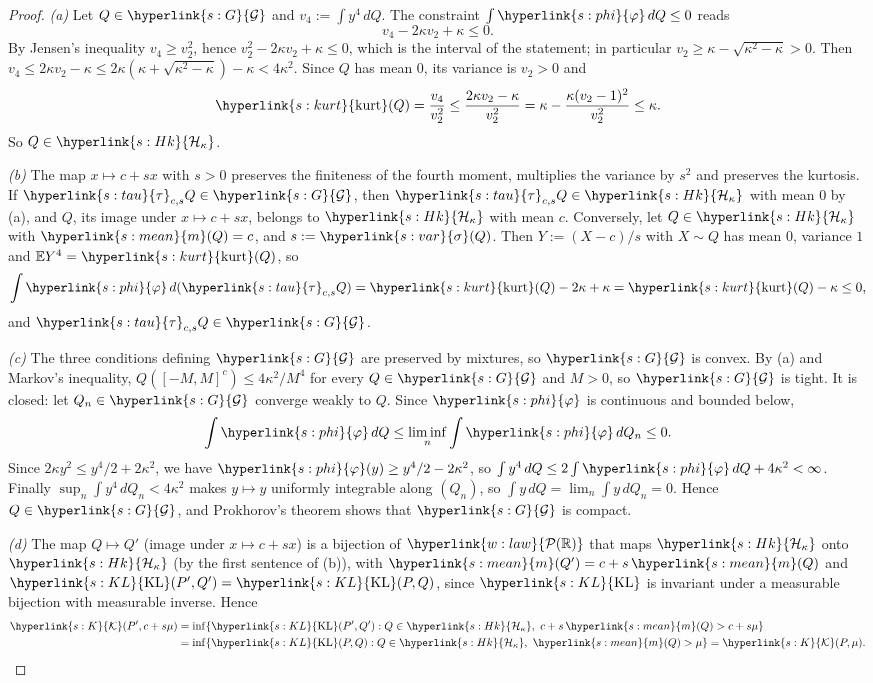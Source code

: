 \documentclass[11pt]{article}
\newcommand{\E}{\mathbb{E}}
\newcommand{\Pspace}{\term{w:law}{\mathcal{P}(\mathbb{R})}}
\newcommand{\sy}[2]{{\hyperlink{#1}{#2}}}
\newcommand{\term}[2]{\hyperlink{#1}{#2}}
\newcommand{\mean}{\sy{s:mean}{m}}
\newcommand{\sd}{\sy{s:var}{\sigma}}
\newcommand{\kurt}{\sy{s:kurt}{\mathrm{kurt}}}
\newcommand{\KL}{\sy{s:KL}{\mathrm{KL}}}
\newcommand{\Hk}{\sy{s:Hk}{\mathcal{H}_{\kappa}}}
\newcommand{\Kc}{\sy{s:K}{\mathcal{K}}}
\newcommand{\phik}{\sy{s:phi}{\varphi}}
\newcommand{\Gk}{\sy{s:G}{\mathcal{G}}}
\newcommand{\tauc}{\sy{s:tau}{\tau}}
\begin{document}
\begin{proof}
\emph{(a)} Let $Q\in\Gk$ and $v_4:=\int y^4\,dQ$. The constraint $\int\phik\,dQ\le0$ reads
\begin{equation*}
  v_4-2\kappa v_2+\kappa\le0.
\end{equation*}
By Jensen's inequality $v_4\ge v_2^2$, hence $v_2^2-2\kappa v_2+\kappa\le0$, which is the interval of the
statement; in particular $v_2\ge\kappa-\sqrt{\kappa^2-\kappa}>0$. Then $v_4\le2\kappa v_2-\kappa\le2\kappa(\kappa+\sqrt{\kappa^2-\kappa})-\kappa<4\kappa^2$.
Since $Q$ has mean $0$, its variance is $v_2>0$ and
\begin{equation*}
  \kurt(Q)=\frac{v_4}{v_2^2}\le\frac{2\kappa v_2-\kappa}{v_2^2}=\kappa-\frac{\kappa(v_2-1)^2}{v_2^2}\le\kappa .
\end{equation*}
So $Q\in\Hk$.

\emph{(b)} The map $x\mapsto c+sx$ with $s>0$ preserves the finiteness of the fourth moment, multiplies the
variance by $s^2$ and preserves the kurtosis. If $\tauc_{c,s}Q\in\Gk$, then $\tauc_{c,s}Q\in\Hk$ with mean $0$ by
(a), and $Q$, its image under $x\mapsto c+sx$, belongs to $\Hk$ with mean $c$. Conversely, let $Q\in\Hk$ with
$\mean(Q)=c$, and $s:=\sd(Q)$. Then $Y:=(X-c)/s$ with $X\sim Q$ has mean $0$, variance $1$ and $\E Y^4=\kurt(Q)$, so
\begin{equation*}
  \int\phik\,d(\tauc_{c,s}Q)=\kurt(Q)-2\kappa+\kappa=\kurt(Q)-\kappa\le0,
\end{equation*}
and $\tauc_{c,s}Q\in\Gk$.

\emph{(c)} The three conditions defining $\Gk$ are preserved by mixtures, so $\Gk$ is convex. By (a) and
Markov's inequality, $Q([-M,M]^c)\le4\kappa^2/M^4$ for every $Q\in\Gk$ and $M>0$, so $\Gk$ is tight. It is
closed: let $Q_n\in\Gk$ converge weakly to $Q$. Since $\phik$ is continuous and bounded below,
\begin{equation*}
  \int\phik\,dQ\le\liminf_n\int\phik\,dQ_n\le0 .
\end{equation*}
Since $2\kappa y^2\le y^4/2+2\kappa^2$, we have $\phik(y)\ge y^4/2-2\kappa^2$, so $\int y^4\,dQ\le2\int\phik\,dQ+4\kappa^2<\infty$.
Finally $\sup_n\int y^4\,dQ_n<4\kappa^2$ makes $y\mapsto y$ uniformly integrable along $(Q_n)$, so
$\int y\,dQ=\lim_n\int y\,dQ_n=0$. Hence $Q\in\Gk$, and Prokhorov's theorem shows that $\Gk$ is compact.

\emph{(d)} The map $Q\mapsto Q'$ (image under $x\mapsto c+sx$) is a bijection of $\Pspace$ that maps $\Hk$ onto
$\Hk$ (by the first sentence of (b)), with $\mean(Q')=c+s\,\mean(Q)$ and $\KL(P',Q')=\KL(P,Q)$, since $\KL$ is
invariant under a measurable bijection with measurable inverse. Hence
\begin{align*}
  \Kc(P',c+s\mu)&=\inf\{\KL(P',Q'):Q\in\Hk,\ c+s\,\mean(Q)>c+s\mu\}\\
  &=\inf\{\KL(P,Q):Q\in\Hk,\ \mean(Q)>\mu\}=\Kc(P,\mu).
\end{align*}
\end{proof}
\end{document}
